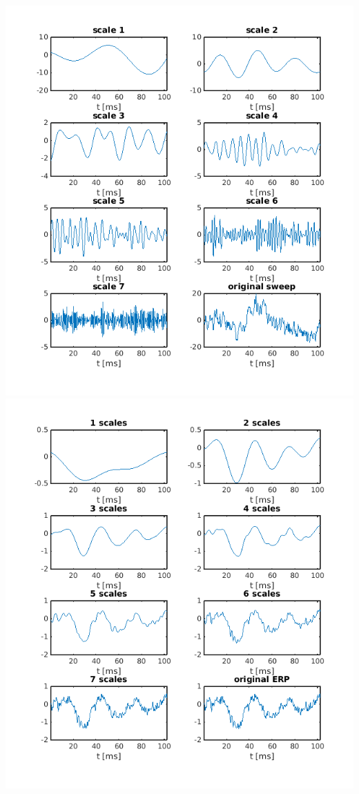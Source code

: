 \documentclass[10pt,a4paper,notitlepage]{report}
\begin{document}
\hspace{-1cm} \includegraphics[scale=0.5]{p3fig2.png}
\includegraphics[scale=0.5]{p3fig3.png}
\vspace{5mm}
\end{document}
